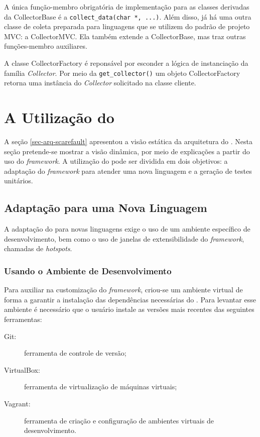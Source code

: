A única função-membro obrigatória de implementação para as classes derivadas da
\textsf{CollectorBase} é a \lstinline|collect_data(char *, ...)|. Além disso, já
há uma outra classe de coleta preparada para linguagens que se utilizem do padrão
de projeto MVC: a \textsf{CollectorMVC}. Ela também extende a \textsf{CollectorBase},
mas traz outras funções-membro auxiliares.

A classe \textsf{CollectorFactory} é reponsável por esconder a lógica de instanciação
da família \textit{Collector}. Por meio da \lstinline|get_collector()| um objeto
\textsf{CollectorFactory} retorna uma instância do \textit{Collector} solicitado na
classe cliente.

\section{A Utilização do \Scarefault} \label{sec-util-scarefault}
A seção \ref{sec-arq-scarefault} apresentou a visão estática da arquitetura do
\Scarefault. Nesta seção pretende-se mostrar a visão dinâmica, por meio
de explicações a partir do uso do \textit{framework}. A utilização do
\scarefault pode ser dividida em dois objetivos: a adaptação
do \textit{framework} para atender uma nova linguagem e a geração de testes unitários.
 
\subsection{Adaptação para uma Nova Linguagem}
A adaptação do \scarefault para novas linguagens exige o uso de um ambiente
específico de desenvolvimento, bem como o uso de janelas de extensibilidade
do \textit{framework}, chamadas de \textit{hotspots}.

\subsubsection{Usando o Ambiente de Desenvolvimento}
Para auxiliar na customização do \textit{framework}, criou-se um ambiente
virtual de forma a garantir a instalação das dependências necessárias do
\Scarefault. Para levantar esse ambiente é necessário que o usuário instale as
versões mais recentes das seguintes ferramentas: 

\begin{description}
\item[Git:] ferramenta de controle de versão;
\item[VirtualBox:] ferramenta de virtualização de máquinas virtuais;
\item[Vagrant:] ferramenta de criação e configuração de ambientes virtuais de desenvolvimento.
\end{description} 

